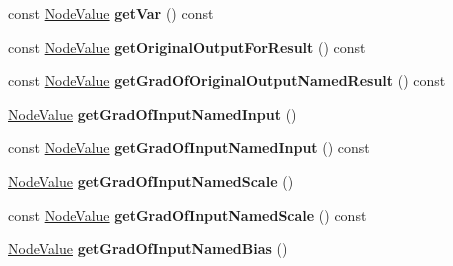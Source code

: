 \begin{DoxyCompactItemize}
const \hyperlink{structglow_1_1_node_value}{Node\+Value} {\bfseries get\+Var} () const
\item 
\mbox{\label{classglow_1_1_batch_normalization_grad_node_a98bb3a414f2da1dfed6f52a08b312540}} 
const \hyperlink{structglow_1_1_node_value}{Node\+Value} {\bfseries get\+Original\+Output\+For\+Result} () const
\item 
\mbox{\label{classglow_1_1_batch_normalization_grad_node_aa339f24532d6d0fc7be67895c567bc99}} 
const \hyperlink{structglow_1_1_node_value}{Node\+Value} {\bfseries get\+Grad\+Of\+Original\+Output\+Named\+Result} () const
\item 
\mbox{\label{classglow_1_1_batch_normalization_grad_node_a913110b67de1b33604df21c1ed1ec8e5}} 
\hyperlink{structglow_1_1_node_value}{Node\+Value} {\bfseries get\+Grad\+Of\+Input\+Named\+Input} ()
\item 
\mbox{\label{classglow_1_1_batch_normalization_grad_node_ae2e9273e386523fb0f35a62739da63a0}} 
const \hyperlink{structglow_1_1_node_value}{Node\+Value} {\bfseries get\+Grad\+Of\+Input\+Named\+Input} () const
\item 
\mbox{\label{classglow_1_1_batch_normalization_grad_node_a2ad3662daba8f77c5747ab495ca4ff2f}} 
\hyperlink{structglow_1_1_node_value}{Node\+Value} {\bfseries get\+Grad\+Of\+Input\+Named\+Scale} ()
\item 
\mbox{\label{classglow_1_1_batch_normalization_grad_node_a7024fbbd86d5fe5ee156f9981551bf3b}} 
const \hyperlink{structglow_1_1_node_value}{Node\+Value} {\bfseries get\+Grad\+Of\+Input\+Named\+Scale} () const
\item 
\mbox{\label{classglow_1_1_batch_normalization_grad_node_affe448f4e6591c56907ef1dc97fe5726}} 
\hyperlink{structglow_1_1_node_value}{Node\+Value} {\bfseries get\+Grad\+Of\+Input\+Named\+Bias} ()
\item 
\mbox{\label{classglow_1_1_batch_normalization_grad_node_aeccc67b5b079cac23df2d9543e5fd175}} 

\end{DoxyCompactItemize}
